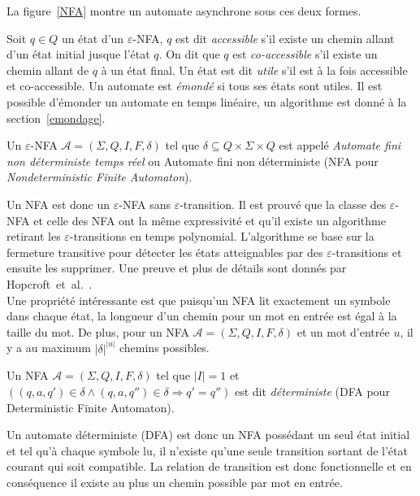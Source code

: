 	La figure~\ref{NFA} montre un automate asynchrone sous ces deux formes.

	
	
	Soit $q \in Q$ un état d'un $\varepsilon$-NFA, $q$ est dit \emph{accessible} s'il existe un chemin allant d'un état initial jusque l'état $q$. On dit que $q$ est \emph{co-accessible} s'il existe un chemin allant de $q$ à un état final. Un état est dit \emph{utile} s'il est à la fois accessible et co-accessible. Un automate est \emph{émondé} si tous ses états sont utiles. Il est possible d'émonder un automate en temps linéaire, un algorithme est donné à la section~\ref{emondage}. \\
	
	\begin{definition}[NFA]
		Un $\varepsilon$-NFA $\mathscr{A}=(\Sigma,Q,I,F,\delta)$ tel que $\delta \subseteq Q \times \Sigma \times Q$ est appelé \emph{Automate fini non déterministe temps réel} ou Automate fini non déterministe (NFA pour \emph{Nondeterministic Finite Automaton}).
	\end{definition}

	Un NFA est donc un $\varepsilon$-NFA sans $\varepsilon$-transition. Il est prouvé que la classe des $\varepsilon$-NFA et celle des NFA ont la même expressivité et qu'il existe un algorithme retirant les $\varepsilon$-transitions en temps polynomial. L'algorithme se base sur la fermeture transitive pour détecter les états atteignables par des $\varepsilon$-transitions et ensuite les supprimer. Une preuve et plus de détails sont donnés par Hopcroft~et~al.~\cite{Hop06}. \\
	Une propriété intéressante est que puisqu'un NFA lit exactement un symbole dans chaque état, la longueur d'un chemin pour un mot en entrée est égal à la taille du mot. De plus, pour un NFA $\mathscr{A}=(\Sigma,Q,I,F,\delta)$ et un mot d'entrée $u$, il y a au maximum $|\delta|^{|u|}$ chemins possibles. \\
	
	
	\begin{definition}[DFA]
		Un NFA $\mathscr{A}=(\Sigma,Q,I,F,\delta)$ tel que $|I| = 1$ et $((q,a,q')\in\delta \wedge (q,a,q'')\in\delta \Rightarrow q'=q'')$ est dit \emph{déterministe} (DFA pour Deterministic Finite Automaton).
	\end{definition}

	Un automate déterministe (DFA) est donc un NFA possédant un seul état initial et tel qu'à chaque symbole lu, il n'existe qu'une seule transition sortant de l'état courant qui soit compatible. La relation de transition est donc fonctionnelle et en conséquence il existe au plus un chemin possible par mot en entrée.
	
